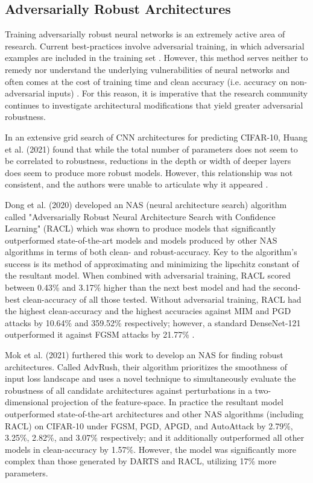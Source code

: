 \documentclass[10pt,twocolumn,letterpaper]{article}
\begin{document}
  \subsection{Adversarially Robust Architectures}
    Training adversarially robust neural networks is an extremely active area of research. Current best-practices involve adversarial training, in which adversarial examples are included in the training set \cite{Madry}. However, this method serves neither to remedy nor understand the underlying vulnerabilities of neural networks and often comes at the cost of training time and clean accuracy (i.e. accuracy on non-adversarial inputs) \cite{RobustVsAccuracy}. For this reason, it is imperative that the research community continues to investigate architectural modifications that yield greater adversarial robustness.

    In an extensive grid search of CNN architectures for predicting CIFAR-10, Huang et al. (2021) found that while the total number of parameters does not seem to be correlated to robustness, reductions in the depth or width of deeper layers does seem to produce more robust models. However, this relationship was not consistent, and the authors were unable to articulate why it appeared \cite{Huang}.

    Dong et al. (2020) developed an NAS (neural architecture search) algorithm called "Adversarially Robust Neural Architecture Search with Confidence Learning" (RACL) which was shown to produce models that significantly outperformed state-of-the-art models and models produced by other NAS algorithms in terms of both clean- and robust-accuracy. Key to the algorithm's success is its method of approximating and minimizing the lipschitz constant of the resultant model. When combined with adversarial training, RACL scored between 0.43\% and 3.17\% higher than the next best model and had the second-best clean-accuracy of all those tested. Without adversarial training, RACL had the highest clean-accuracy and the highest accuracies against MIM and PGD attacks by 10.64\% and 359.52\% respectively; however, a standard DenseNet-121 outperformed it against FGSM attacks by 21.77\% \cite{RACL}.

    Mok et al. (2021) furthered this work to develop an NAS for finding robust architectures. Called AdvRush, their algorithm prioritizes the smoothness of input loss landscape and uses a novel technique to simultaneously evaluate the robustness of all candidate architectures against perturbations in a two-dimensional projection of the feature-space. In practice the resultant model outperformed state-of-the-art architectures and other NAS algorithms (including RACL) on CIFAR-10 under FGSM, PGD, APGD, and AutoAttack by 2.79\%, 3.25\%, 2.82\%, and 3.07\% respectively; and it additionally outperformed all other models in clean-accuracy by 1.57\%. However, the model was significantly more complex than those generated by DARTS and RACL, utilizing 17\% more parameters.

{\small


}
\end{document}
